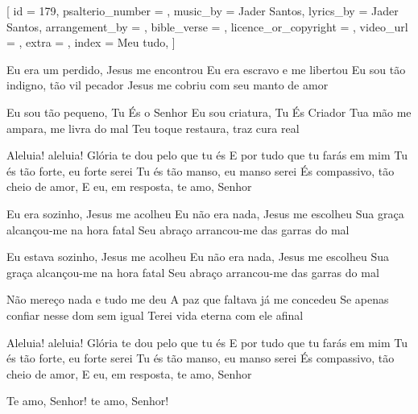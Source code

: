 [
    id                     = {179},
    psalterio_number       = {},
    music_by               = {Jader Santos},
    lyrics_by              = {Jader Santos},
    arrangement_by         = {},
    bible_verse            = {},
    licence_or_copyright   = {},
    video_url              = {},
    extra                  = {},
    index                  = {Meu tudo},
]

\beginverse
Eu era um perdido, Jesus me encontrou
Eu era escravo e me libertou
Eu sou tão indigno, tão vil pecador
Jesus me cobriu com seu manto de amor
\endverse

\beginverse
Eu sou tão pequeno, Tu És o Senhor
Eu sou criatura, Tu És Criador
Tua mão me ampara, me livra do mal
Teu toque restaura, traz cura real
\endverse

\beginchorus
Aleluia! aleluia!
Glória te dou pelo que tu és
E por tudo que tu farás em mim
Tu és tão forte, eu forte serei
Tu és tão manso, eu manso serei
És compassivo, tão cheio de amor,
E eu, em resposta, te amo, Senhor
\endchorus

\beginverse
Eu era sozinho, Jesus me acolheu
Eu não era nada, Jesus me escolheu
Sua graça alcançou-me na hora fatal
Seu abraço arrancou-me das garras do mal
\endverse

\beginverse
Eu estava sozinho, Jesus me acolheu
Eu não era nada, Jesus me escolheu
Sua graça alcançou-me na hora fatal
Seu abraço arrancou-me das garras do mal
\endverse

\beginverse
Não mereço nada e tudo me deu
A paz que faltava já me concedeu
Se apenas confiar nesse dom sem igual
Terei vida eterna com ele afinal
\endverse

\beginchorus
Aleluia! aleluia!
Glória te dou pelo que tu és
E por tudo que tu farás em mim
Tu és tão forte, eu forte serei
Tu és tão manso, eu manso serei
És compassivo, tão cheio de amor,
E eu, em resposta, te amo, Senhor

Te amo, Senhor! te amo, Senhor!
\endchorus



\endsong
